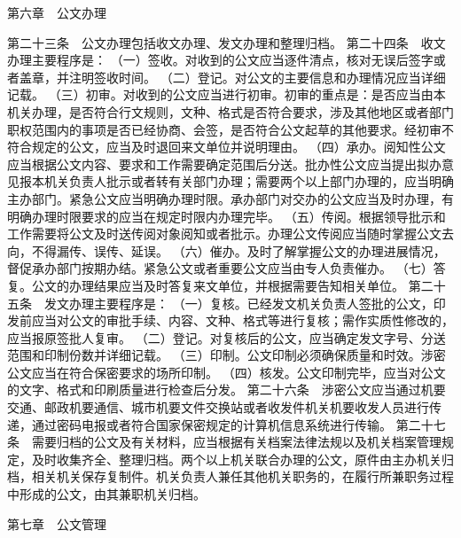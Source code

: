 \documentclass{gbt9704}
\begin{document}
第六章　公文办理

第二十三条　公文办理包括收文办理、发文办理和整理归档。
第二十四条　收文办理主要程序是：
（一）签收。对收到的公文应当逐件清点，核对无误后签字或者盖章，并注明签收时间。
（二）登记。对公文的主要信息和办理情况应当详细记载。
（三）初审。对收到的公文应当进行初审。初审的重点是：是否应当由本机关办理，是否符合行文规则，文种、格式是否符合要求，涉及其他地区或者部门职权范围内的事项是否已经协商、会签，是否符合公文起草的其他要求。经初审不符合规定的公文，应当及时退回来文单位并说明理由。
（四）承办。阅知性公文应当根据公文内容、要求和工作需要确定范围后分送。批办性公文应当提出拟办意见报本机关负责人批示或者转有关部门办理；需要两个以上部门办理的，应当明确主办部门。紧急公文应当明确办理时限。承办部门对交办的公文应当及时办理，有明确办理时限要求的应当在规定时限内办理完毕。
（五）传阅。根据领导批示和工作需要将公文及时送传阅对象阅知或者批示。办理公文传阅应当随时掌握公文去向，不得漏传、误传、延误。
（六）催办。及时了解掌握公文的办理进展情况，督促承办部门按期办结。紧急公文或者重要公文应当由专人负责催办。
（七）答复。公文的办理结果应当及时答复来文单位，并根据需要告知相关单位。
第二十五条　发文办理主要程序是：
（一）复核。已经发文机关负责人签批的公文，印发前应当对公文的审批手续、内容、文种、格式等进行复核；需作实质性修改的，应当报原签批人复审。
（二）登记。对复核后的公文，应当确定发文字号、分送范围和印制份数并详细记载。
（三）印制。公文印制必须确保质量和时效。涉密公文应当在符合保密要求的场所印制。
（四）核发。公文印制完毕，应当对公文的文字、格式和印刷质量进行检查后分发。
第二十六条　涉密公文应当通过机要交通、邮政机要通信、城市机要文件交换站或者收发件机关机要收发人员进行传递，通过密码电报或者符合国家保密规定的计算机信息系统进行传输。
第二十七条　需要归档的公文及有关材料，应当根据有关档案法律法规以及机关档案管理规定，及时收集齐全、整理归档。两个以上机关联合办理的公文，原件由主办机关归档，相关机关保存复制件。机关负责人兼任其他机关职务的，在履行所兼职务过程中形成的公文，由其兼职机关归档。

第七章　公文管理
\end{document}
